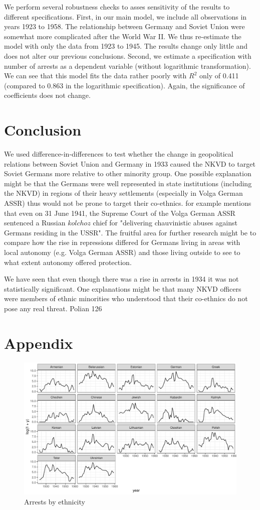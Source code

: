 \documentclass[11pt]{article}
\begin{document}
We perform several robustness checks to asses sensitivity of the results to different specifications. First, in our main model, we include all observations in years 1923 to 1958. The relationship between Germany and Soviet Union were somewhat more complicated after the World War II. We thus re-estimate the model with only the data from 1923 to 1945. The results change only little and does not alter our previous conclusions. Second, we estimate a specification with number of arrests as a dependent variable (without logarithmic transformation). We can see that this model fits the data rather poorly with  $R^2$ only of 0.411 (compared to 0.863 in the logarithmic specification). Again, the significance of coefficients does not change. 
\section{Conclusion}
We used difference-in-differences to test whether the change in geopolitical relations between Soviet Union and Germany in 1933 caused the NKVD to target Soviet Germans more relative to other minority group. One possible explanation might be that the Germans were well represented in state institutions (including the NKVD) in regions of their heavy settlements (especially in Volga German ASSR) thus would not be prone to target their co-ethnics. \citet[p. 126]{polian_against_2003} for example mentions that even on 31 June 1941, the Supreme Court of the Volga German ASSR sentenced a Russian $kolchoz$ chief for "delivering chauvinistic abuses against Germans residing in the USSR". The fruitful area for further research might be to compare how the rise in repressions differed for Germans living in areas with local autonomy (e.g. Volga German ASSR) and those living outside to see to what extent autonomy offered protection. 

We have seen that even though there was a rise in arrests in 1934 it was not statistically significant. One explanations might be that many NKVD officers were members of ethnic minorities who understood that their co-ethnics do not pose any real threat.  Polian 126




\newpage
\section*{Appendix}

\begin{figure}[h]
\centering
\includegraphics[width=\textwidth]{plots/arrests_by_ethnicity.pdf}
\caption{Arrests by ethnicity}
\label{fig:universe}
\end{figure}
\newpage
\thispagestyle{empty}

\end{document}
